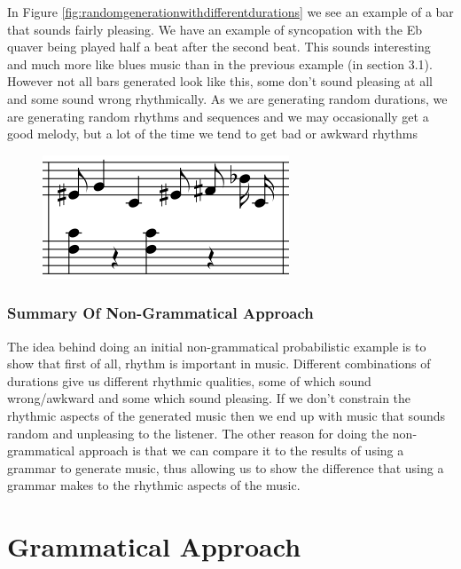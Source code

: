 \documentclass[pdftex,12pt,a4paper]{report}
\begin{document}
In Figure \ref{fig:randomgenerationwithdifferentdurations} we see an example of a bar that sounds fairly pleasing. We have an example of syncopation with the Eb quaver being played half a beat after the second beat. This sounds interesting and much more like blues music than in the previous example (in section 3.1). However not all bars generated look like this, some don't sound pleasing at all and some sound wrong rhythmically. As we are generating random durations, we are generating random rhythms and sequences and we may occasionally get a good melody, but a lot of the time we tend to get bad or awkward rhythms

\begin{figure}[here]
  \centering
  \includegraphics[scale=0.6]{figure/randomgenerationdifferentdurations.png}
  \label{fig:probabilisticgenerationwithdifferentdurations}
\end{figure}

\subsection{Summary Of Non-Grammatical Approach}
The idea behind doing an initial non-grammatical probabilistic example is to show that first of all, rhythm is important in music. Different combinations of durations give us different rhythmic qualities, some of which sound wrong/awkward and some which sound pleasing. If we don't constrain the rhythmic aspects of the generated music then we end up with music that sounds random and unpleasing to the listener.
The other reason for doing the non-grammatical approach is that we can compare it to the results of using a grammar to generate music, thus allowing us to show the difference that using a grammar makes to the rhythmic aspects of the music.

\pagebreak

\chapter{Grammatical Approach}
\end{document}
